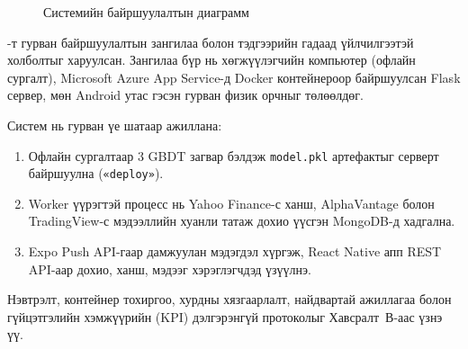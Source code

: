 \begin{figure}[H]
{%
}
\caption{Системийн байршуулалтын диаграмм}
\label{fig:deployment_view}
\end{figure}

-т гурван байршуулалтын зангилаа болон тэдгээрийн гадаад үйлчилгээтэй холболтыг харуулсан. Зангилаа бүр нь хөгжүүлэгчийн компьютер (офлайн сургалт), Microsoft Azure App Service-д Docker контейнероор байршуулсан Flask сервер, мөн Android утас гэсэн гурван физик орчныг төлөөлдөг.

Систем нь гурван үе шатаар ажиллана:
\begin{enumerate}\setlength\itemsep{0pt}
    \item Офлайн сургалтаар 3 GBDT загвар бэлдэж \texttt{model.pkl} артефактыг серверт байршуулна (\texttt{«deploy»}).
    \item Worker үүрэгтэй процесс нь Yahoo Finance-с ханш, AlphaVantage болон TradingView-с мэдээллийн хуанли татаж дохио үүсгэн MongoDB-д хадгална.
    \item Expo Push API-гаар дамжуулан мэдэгдэл хүргэж, React Native апп REST API-аар дохио, ханш, мэдээг хэрэглэгчдэд үзүүлнэ.
\end{enumerate}
Нэвтрэлт, контейнер тохиргоо, хурдны хязгаарлалт, найдвартай ажиллагаа болон гүйцэтгэлийн хэмжүүрийн (KPI) дэлгэрэнгүй протоколыг Хавсралт~В-аас үзнэ үү.


